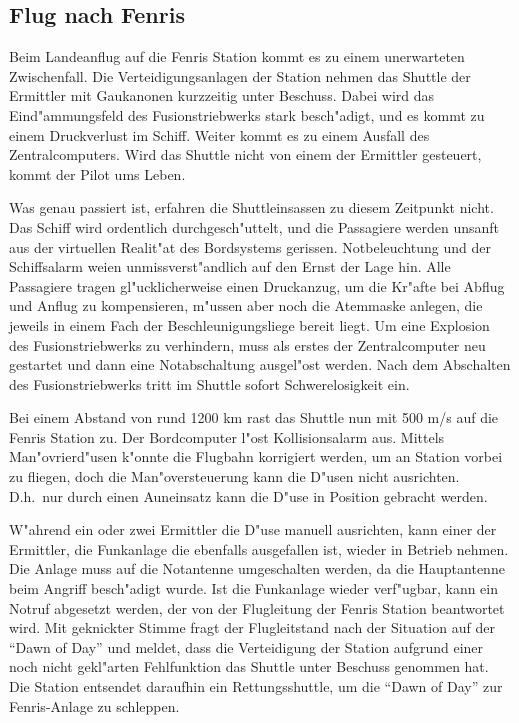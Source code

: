 \subsection{Flug nach Fenris}

Beim Landeanflug auf die Fenris Station kommt es zu einem unerwarteten Zwischenfall. Die Verteidigungsanlagen der Station nehmen das Shuttle der Ermittler mit Gau\3kanonen kurzzeitig unter Beschuss. Dabei wird das Eind"ammungsfeld des Fusionstriebwerks stark besch"adigt, und es kommt zu einem Druckverlust im Schiff. Weiter kommt es zu einem Ausfall des Zentralcomputers. Wird das Shuttle nicht von einem der Ermittler gesteuert, kommt der Pilot ums Leben.

Was genau passiert ist, erfahren die Shuttleinsassen zu diesem Zeitpunkt nicht. Das Schiff wird ordentlich durchgesch"uttelt, und die Passagiere werden unsanft aus der virtuellen Realit"at des Bordsystems gerissen. Notbeleuchtung und der Schiffsalarm wei\3en unmissverst"andlich auf den Ernst der Lage hin. Alle Passagiere tragen gl"ucklicherweise einen Druckanzug, um die Kr"afte bei Abflug und Anflug zu kompensieren, m"ussen aber noch die Atemmaske anlegen, die jeweils in einem Fach der Beschleunigungsliege bereit liegt. Um eine Explosion des Fusionstriebwerks zu verhindern, muss als erstes der Zentralcomputer neu gestartet und dann eine Notabschaltung ausgel"ost werden. Nach dem Abschalten des Fusionstriebwerks tritt im Shuttle sofort Schwerelosigkeit ein.

Bei einem Abstand von rund 1200 km rast das Shuttle nun mit 500 m/s auf die Fenris Station zu. Der Bordcomputer l"ost Kollisionsalarm aus. Mittels Man"ovrierd"usen k"onnte die Flugbahn korrigiert werden, um an Station vorbei zu fliegen, doch die Man"oversteuerung kann die D"usen nicht ausrichten. D.h.~nur durch einen Au\3neinsatz kann die D"use in Position gebracht werden.

W"ahrend ein oder zwei Ermittler die D"use manuell ausrichten, kann einer der Ermittler, die Funkanlage die ebenfalls ausgefallen ist, wieder in Betrieb nehmen. Die Anlage muss auf die Notantenne umgeschalten werden, da die Hauptantenne beim Angriff besch"adigt wurde. Ist die Funkanlage wieder verf"ugbar, kann ein Notruf abgesetzt werden, der von der Flugleitung der Fenris Station beantwortet wird. Mit geknickter Stimme fragt der Flugleitstand nach der Situation auf der "`Dawn of Day"' und meldet, dass die Verteidigung der Station aufgrund einer noch nicht gekl"arten Fehlfunktion das Shuttle unter Beschuss genommen hat. Die Station entsendet daraufhin ein Rettungsshuttle, um die "`Dawn of Day"' zur Fenris-Anlage zu schleppen.

